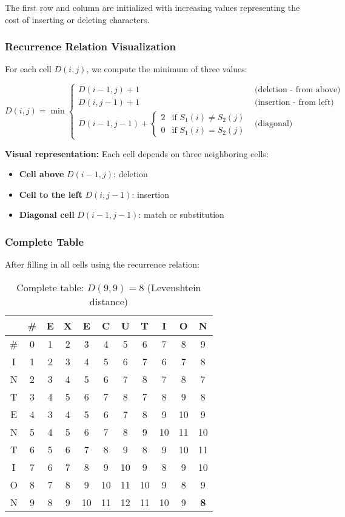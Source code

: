 \documentclass[11pt,a4paper]{article}
\theoremstyle{definition}
\theoremstyle{plain}
\theoremstyle{remark}
\begin{document}
The first row and column are initialized with increasing values representing the cost of inserting or deleting characters.

\subsubsection{Recurrence Relation Visualization}

For each cell $D(i,j)$, we compute the minimum of three values:

\[
D(i,j) = \min \begin{cases}
D(i-1,j) + 1 & \text{(deletion - from above)} \\
D(i,j-1) + 1 & \text{(insertion - from left)} \\
D(i-1,j-1) + \begin{cases}
2 & \text{if } S_1(i) \neq S_2(j) \\
0 & \text{if } S_1(i) = S_2(j)
\end{cases} & \text{(diagonal)}
\end{cases}
\]

\textbf{Visual representation:} Each cell depends on three neighboring cells:
\begin{itemize}
    \item \textbf{Cell above} $D(i-1,j)$: deletion
    \item \textbf{Cell to the left} $D(i,j-1)$: insertion
    \item \textbf{Diagonal cell} $D(i-1,j-1)$: match or substitution
\end{itemize}

\subsubsection{Complete Table}

After filling in all cells using the recurrence relation:

\begin{table}[ht]
\centering
\begin{tabular}{|c|c|c|c|c|c|c|c|c|c|c|}
\hline
 & \# & E & X & E & C & U & T & I & O & N \\
\hline
\# & 0 & 1 & 2 & 3 & 4 & 5 & 6 & 7 & 8 & 9 \\
\hline
I & 1 & 2 & 3 & 4 & 5 & 6 & 7 & 6 & 7 & 8 \\
\hline
N & 2 & 3 & 4 & 5 & 6 & 7 & 8 & 7 & 8 & 7 \\
\hline
T & 3 & 4 & 5 & 6 & 7 & 8 & 7 & 8 & 9 & 8 \\
\hline
E & 4 & 3 & 4 & 5 & 6 & 7 & 8 & 9 & 10 & 9 \\
\hline
N & 5 & 4 & 5 & 6 & 7 & 8 & 9 & 10 & 11 & 10 \\
\hline
T & 6 & 5 & 6 & 7 & 8 & 9 & 8 & 9 & 10 & 11 \\
\hline
I & 7 & 6 & 7 & 8 & 9 & 10 & 9 & 8 & 9 & 10 \\
\hline
O & 8 & 7 & 8 & 9 & 10 & 11 & 10 & 9 & 8 & 9 \\
\hline
N & 9 & 8 & 9 & 10 & 11 & 12 & 11 & 10 & 9 & \textbf{8} \\
\hline
\end{tabular}
\caption{Complete table: $D(9,9) = 8$ (Levenshtein distance)}
\end{table}
\end{document}
